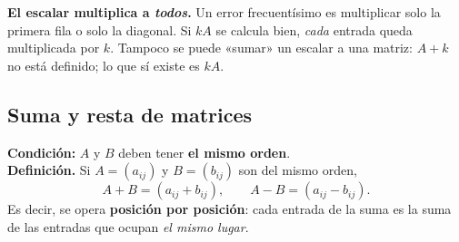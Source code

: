 \documentclass[12pt, letterpaper]{article}
\begin{document}
\begin{cuadroadvertencia}
  \small
  \textbf{El escalar multiplica a \emph{todos}.} Un error frecuentísimo es
  multiplicar solo la primera fila o solo la diagonal. Si $kA$ se calcula
  bien, \emph{cada} entrada queda multiplicada por $k$. Tampoco se puede
  «sumar» un escalar a una matriz: $A+k$ no está definido; lo que sí existe
  es $kA$.
\end{cuadroadvertencia}

\subsection{Suma y resta de matrices}

\begin{cuadroteoria}
  \small
  \textbf{Condición:} $A$ y $B$ deben tener \textbf{el mismo orden}.
  \\[3pt]
  \textbf{Definición.} Si $A=(a_{ij})$ y $B=(b_{ij})$ son del mismo orden,
  \[
    A+B=(a_{ij}+b_{ij}),
    \qquad
    A-B=(a_{ij}-b_{ij}).
  \]
  Es decir, se opera \textbf{posición por posición}: cada entrada de la suma
  es la suma de las entradas que ocupan \emph{el mismo lugar}.
\end{cuadroteoria}

\begin{center}
\end{center}
\end{document}
